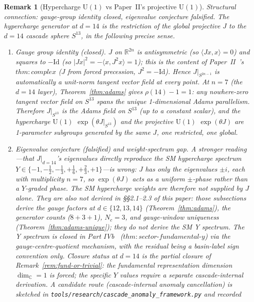\documentclass[12pt,a4paper]{article}
\newtheorem{remark}[theorem]{Remark}
\begin{document}
\begin{remark}[Hypercharge $\mathrm{U}(1)$ vs Paper~II's projective $\mathrm{U}(1)$]
\medskip
\noindent\emph{Structural connection: gauge-group identity closed,
eigenvalue conjecture falsified.} The hypercharge generator at $d=14$
\emph{is} the restriction of the global projective $J$ to the $d=14$
cascade sphere $S^{13}$, in the following precise sense.
\begin{enumerate}
\item \emph{Gauge group identity (closed).} $J$ on $\mathbb{R}^{2n}$
is antisymmetric (so $\langle Jx,x\rangle = 0$) and squares to
$-\mathrm{Id}$ (so $|Jx|^2 = -\langle x, J^2 x\rangle = 1$); this is
the content of Paper~II~\cite{part2}'s
$\mathit{thm{:}complex}$ ($J$ from forced precession,
$J^2=-\mathrm{Id}$). Hence
$J|_{S^{2n-1}}$ is automatically a unit-norm tangent vector field at
every point. At $n=7$ (the $d=14$ layer), Theorem~\ref{thm:adams}
gives $\rho(14)-1 = 1$: any nowhere-zero tangent vector field on
$S^{13}$ spans the unique 1-dimensional Adams parallelism. Therefore
$J|_{S^{13}}$ \emph{is} the Adams field on $S^{13}$ (up to a constant
scalar), and the hypercharge $\mathrm{U}(1)$
$\exp(\theta J|_{S^{13}})$ and the projective $\mathrm{U}(1)$
$\exp(\theta J)$ are 1-parameter subgroups generated by the same $J$,
one restricted, one global.
\item \emph{Eigenvalue conjecture (falsified) and weight-spectrum gap.}
A stronger reading
---that $J|_{d=14}$'s eigenvalues directly reproduce the SM
hypercharge spectrum $Y\in\{-1,-\tfrac12,-\tfrac13,+\tfrac16,
+\tfrac23,+1\}$---is wrong: $J$ has only the eigenvalues $\pm i$, each
with multiplicity $n=7$, so $\exp(\theta J)$ acts as a uniform
$\pm$-phase rather than a $Y$-graded phase. The SM hypercharge
weights are therefore \emph{not} supplied by $J$ alone. They are also
not derived in \S\S2.1--2.3 of this paper: those subsections derive
the gauge factors at $d\in\{12,13,14\}$ (Theorem~\ref{thm:adams}),
the generator counts ($8+3+1$), $N_c=3$, and gauge-window uniqueness
(Theorem~\ref{thm:adams-unique}); they do not derive the SM Y
spectrum. The Y spectrum is closed in Part IVb~\cite{part4b}
($\mathit{thm{:}sector\text{-}fundamental\text{-}y}$) via the
gauge-centre-quotient mechanism, with the residual being a
basin-label sign convention only. Closure status at $d=14$ is
the partial closure of Remark~\ref{rem:fund-or-trivial}: the
fundamental representation \emph{dimension} $\dim_{\mathbb{C}}=1$ is
forced; the specific $Y$ \emph{values} require a separate
cascade-internal derivation. A candidate route (cascade-internal
anomaly cancellation) is sketched in
\texttt{tools/research/cascade\_anomaly\_framework.py} and recorded

\end{enumerate}
\end{remark}
\end{document}
